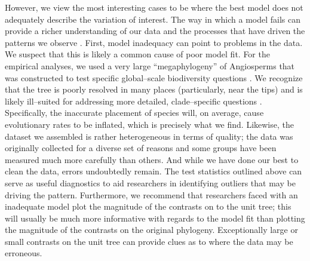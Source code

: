 \documentclass[a4paper,11pt]{article}
\begin{document}
{However, we view the most interesting cases to be where the best model does not adequately describe the variation of interest. The way in which a model fails can provide a richer understanding of our data and the processes that have driven the patterns we observe \citep{Gelman2012}. First, model inadequacy can point to problems in the data. We suspect that this is likely a common cause of poor model fit. For the empirical analyses, we used a very large ``megaphylogeny'' of Angiosperms that was constructed to test specific global--scale biodiversity questions \citep{Zanne2013}. We recognize that the tree is poorly resolved in many places (particularly, near the tips) and is likely ill--suited for addressing more detailed, clade--specific questions \citep[see the recent critique by][]{DonoghueEdwards}. Specifically, the inaccurate placement of species will, on average, cause evolutionary rates to be inflated, which is precisely what we find. Likewise, the dataset we assembled is rather heterogeneous in terms of quality; the data was originally collected for a diverse set of reasons and some groups have been measured much more carefully than others. And while we have done our best to clean the data, errors undoubtedly remain. The test statistics outlined above can serve as useful diagnostics to aid researchers in identifying outliers that may be driving the pattern. Furthermore, we recommend that researchers faced with an inadequate model plot the magnitude of the contrasts on to the unit tree; this will usually be much more informative with regards to the model fit than plotting the magnitude of the contrasts on the original phylogeny. Exceptionally large or small contrasts on the unit tree can provide clues as to where the data may be erroneous.

}
\end{document}
